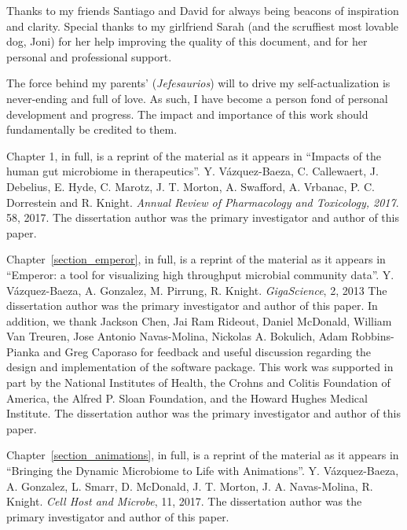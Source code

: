 \begin{frontmatter}
\begin{acknowledgements}
    Thanks to my friends Santiago and David for always being beacons of 
    inspiration and clarity. Special thanks to my girlfriend Sarah (and the 
    scruffiest most lovable dog, Joni) for her help improving the quality of 
    this document, and for her personal and professional support.

    The force behind my parents' (\textit{Jefesaurios}) will to drive my 
    self-actualization is never-ending and full of love. As such, I have become 
    a person fond of personal development and progress. The impact and 
    importance of this work should fundamentally be credited to them.

    Chapter 1, in full, is a reprint of the material as it appears in ``Impacts 
    of the human gut microbiome in therapeutics''. Y.  V\'azquez-Baeza, C.  
    Callewaert, J. Debelius, E. Hyde, C.  Marotz, J. T.  Morton, A. Swafford, 
    A. Vrbanac, P. C.  Dorrestein and R.  Knight.  \emph{Annual Review of 
    Pharmacology and Toxicology, 2017}. 58, 2017. The dissertation author was 
    the primary investigator and author of this paper.

    Chapter~\ref{section_emperor}, in full, is a reprint of the material as it 
    appears in ``Emperor: a tool for visualizing high throughput microbial 
    community data''. Y. V\'azquez-Baeza, A. Gonzalez, M. Pirrung, R.  Knight.  
    \emph{GigaScience}, 2, 2013 The dissertation author was the primary 
    investigator and author of this paper. In addition, we thank Jackson Chen, 
    Jai Ram Rideout, Daniel McDonald, William Van Treuren, Jose Antonio 
    Navas\hyp{}Molina, Nickolas A. Bokulich, Adam Robbins\hyp{}Pianka and Greg 
    Caporaso for feedback and useful discussion regarding the design and 
    implementation of the software package. This work was supported in part by 
    the National Institutes of Health, the Crohns and Colitis Foundation of 
    America, the Alfred P. Sloan Foundation, and the Howard Hughes Medical 
    Institute. The dissertation author was the primary investigator and 
    author of this paper.

    Chapter~\ref{section_animations}, in full, is a reprint of the material as 
    it appears in ``Bringing the Dynamic Microbiome to Life with Animations''.  
    Y.  V\'azquez-Baeza, A. Gonzalez, L. Smarr, D.  McDonald, J.  T. Morton, J.  
    A.  Navas-Molina, R. Knight. \emph{Cell Host and Microbe}, 11, 2017. The 
    dissertation author was the primary investigator and author of this 
    paper.


\end{acknowledgements}
\end{frontmatter}
